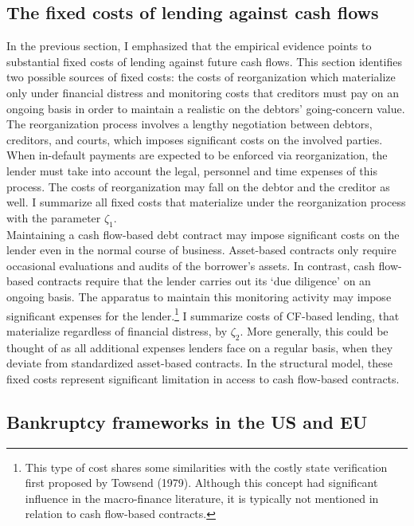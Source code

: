\documentclass[12pt]{article}
\begin{document}
\subsection{The fixed costs of lending against cash flows \label{sec:fixed costs}}
In the previous section, I emphasized that the empirical evidence points to substantial fixed costs of lending against future cash flows. This section identifies two possible sources of fixed costs: the costs of reorganization which materialize only under financial distress and monitoring costs that creditors must pay on an ongoing basis in order to maintain a realistic on the debtors' going-concern value. \vspace{3mm} \\
The reorganization process involves a lengthy negotiation between debtors, creditors, and courts, which imposes significant costs on the involved parties. When in-default payments are expected to be enforced via reorganization, the lender must take into account the legal, personnel and time expenses of this process. The costs of reorganization may fall on the debtor and the creditor as well. I summarize all fixed costs that materialize under the reorganization process with the parameter $\zeta_1$. \vspace{3mm} \\
Maintaining a cash flow-based debt contract may impose significant costs on the lender even in the normal course of business. Asset-based contracts only require occasional evaluations and audits of the borrower's assets. In contrast, cash flow-based contracts require that the lender carries out its `due diligence' on an ongoing basis. The apparatus to maintain this monitoring activity may impose significant expenses for the lender.\footnote{This type of cost shares some similarities with the costly state verification first proposed by Towsend (1979). Although this concept had significant influence in the macro-finance literature, it is typically not mentioned in relation to cash flow-based contracts.} I summarize costs of CF-based lending, that materialize regardless of financial distress, by $\zeta_2$. More generally, this could be thought of as all additional expenses lenders face on a regular basis, when they deviate from standardized asset-based contracts. In the structural model, these fixed costs represent significant limitation in access to cash flow-based contracts. 


\subsection{Bankruptcy frameworks in the US and EU  \label{sec:A1}}
\end{document}
